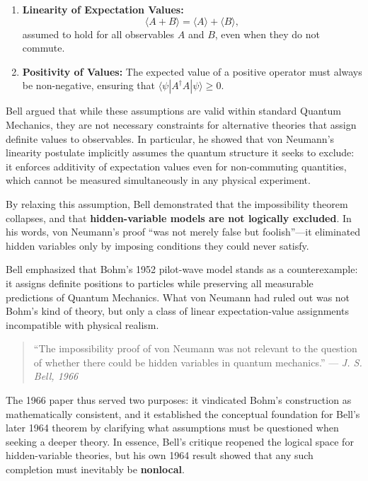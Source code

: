 \begin{enumerate}
    \item \textbf{Linearity of Expectation Values:}
    \[
    \langle A + B \rangle = \langle A \rangle + \langle B \rangle,
    \]
    assumed to hold for all observables $A$ and $B$, even when they do not commute.
    
    \item \textbf{Positivity of Values:}  
    The expected value of a positive operator must always be non-negative, ensuring that $\langle \psi | A^\dagger A | \psi \rangle \ge 0$.
\end{enumerate}

Bell argued that while these assumptions are valid within standard Quantum Mechanics, they are not necessary constraints for alternative theories that assign definite values to observables.  
In particular, he showed that von Neumann’s linearity postulate implicitly assumes the quantum structure it seeks to exclude: it enforces additivity of expectation values even for non-commuting quantities, which cannot be measured simultaneously in any physical experiment.

By relaxing this assumption, Bell demonstrated that the impossibility theorem collapses, and that \textbf{hidden-variable models are not logically excluded}.  
In his words, von Neumann’s proof ``was not merely false but foolish''—it eliminated hidden variables only by imposing conditions they could never satisfy.

Bell emphasized that Bohm’s 1952 pilot-wave model stands as a counterexample: it assigns definite positions to particles while preserving all measurable predictions of Quantum Mechanics.  
What von Neumann had ruled out was not Bohm’s kind of theory, but only a class of linear expectation-value assignments incompatible with physical realism.

\begin{quote}
    ``The impossibility proof of von Neumann was not relevant to the question of whether there could be hidden variables in quantum mechanics.''  
    \hfill — \textit{J. S. Bell, 1966}
\end{quote}

The 1966 paper thus served two purposes: it vindicated Bohm’s construction as mathematically consistent, and it established the conceptual foundation for Bell’s later 1964 theorem by clarifying what assumptions must be questioned when seeking a deeper theory.  
In essence, Bell’s critique reopened the logical space for hidden-variable theories, but his own 1964 result showed that any such completion must inevitably be \textbf{nonlocal}.

